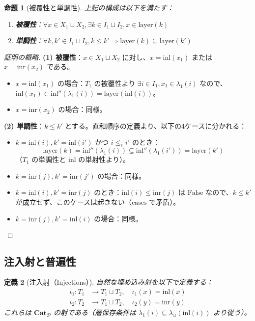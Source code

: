 \documentclass[a4paper,12pt]{ltjsarticle}
\newtheorem{definition}{定義}[section]
\newtheorem{proposition}[definition]{命題}
\theoremstyle{definition}
\begin{document}
\begin{proposition}[被覆性と単調性]
上記の構成は以下を満たす：
\begin{enumerate}
    \item \textbf{被覆性}：$\forall x \in X_1 \sqcup X_2, \exists k \in I_1 \sqcup I_2, x \in \text{layer}(k)$
    \item \textbf{単調性}：$\forall k, k' \in I_1 \sqcup I_2, k \leq k' \Rightarrow \text{layer}(k) \subseteq \text{layer}(k')$
\end{enumerate}
\end{proposition}

\begin{proof}[証明の概略]
\textbf{(1) 被覆性}：$x \in X_1 \sqcup X_2$ に対し、$x = \mathrm{inl}(x_1)$ または $x = \mathrm{inr}(x_2)$ である。
\begin{itemize}
    \item $x = \mathrm{inl}(x_1)$ の場合：$T_1$ の被覆性より $\exists i \in I_1, x_1 \in \lambda_1(i)$ なので、$\mathrm{inl}(x_1) \in \mathrm{inl}''(\lambda_1(i)) = \text{layer}(\mathrm{inl}(i))$。
    \item $x = \mathrm{inr}(x_2)$ の場合：同様。
\end{itemize}

\textbf{(2) 単調性}：$k \leq k'$ とする。直和順序の定義より、以下の4ケースに分かれる：
\begin{itemize}
    \item $k = \mathrm{inl}(i), k' = \mathrm{inl}(i')$ かつ $i \leq_1 i'$ のとき：
    \[
    \text{layer}(k) = \mathrm{inl}''(\lambda_1(i)) \subseteq \mathrm{inl}''(\lambda_1(i')) = \text{layer}(k')
    \]
    （$T_1$ の単調性と $\mathrm{inl}$ の単射性より）。
    \item $k = \mathrm{inr}(j), k' = \mathrm{inr}(j')$ の場合：同様。
    \item $k = \mathrm{inl}(i), k' = \mathrm{inr}(j)$ のとき：$\mathrm{inl}(i) \leq \mathrm{inr}(j)$ は $\mathrm{False}$ なので、$k \leq k'$ が成立せず、このケースは起きない（$\mathrm{cases}$ で矛盾）。
    \item $k = \mathrm{inr}(j), k' = \mathrm{inl}(i)$ の場合：同様。
\end{itemize}
\end{proof}

\subsection{注入射と普遍性}

\begin{definition}[注入射（Injections）]
自然な埋め込み射を以下で定義する：
\begin{align*}
    \iota_1 : T_1 &\to T_1 \sqcup T_2, \quad \iota_1(x) = \mathrm{inl}(x) \\
    \iota_2 : T_2 &\to T_1 \sqcup T_2, \quad \iota_2(y) = \mathrm{inr}(y)
\end{align*}
これらは $\mathbf{Cat}_{\mathcal{D}}$ の射である（層保存条件は $\lambda_1(i) \subseteq \lambda_{\sqcup}(\mathrm{inl}(i))$ より従う）。
\end{definition}
\end{document}
